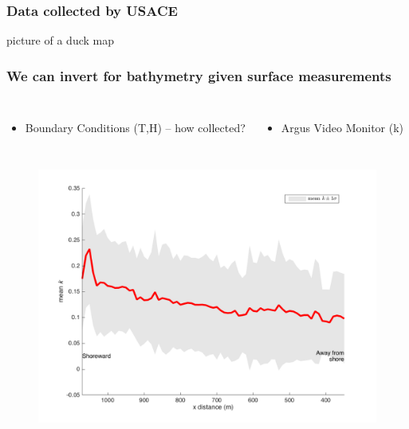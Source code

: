 \documentclass[7pt]{beamer}
\begin{document}
\begin{frame}
\frametitle{Data collected by USACE  }

picture of a duck
map



\end{frame}


\begin{frame}
\frametitle{We can invert for bathymetry given surface measurements}
\begin{columns}
\begin{itemize}
\item Boundary Conditions (T,H) -- how collected?

\end{itemize}
\begin{itemize}
\item Argus Video Monitor (k)
\end{itemize}
\end{columns}

\begin{figure}[H]
\centering
\includegraphics[width=.7\linewidth]{img/k1Dmean_std.png}

\end{figure}
\end{frame}
\end{document}
